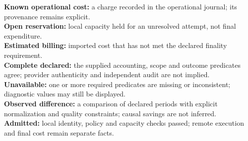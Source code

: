 \documentclass[10pt,twocolumn]{article}
\begin{document}
\noindent\textbf{Known operational cost:} a charge recorded in the operational journal; its provenance remains explicit.\\
\textbf{Open reservation:} local capacity held for an unresolved attempt, not final expenditure.\\
\textbf{Estimated billing:} imported cost that has not met the declared finality requirement.\\
\textbf{Complete declared:} the supplied accounting, scope and outcome predicates agree; provider authenticity and independent audit are not implied.\\
\textbf{Unavailable:} one or more required predicates are missing or inconsistent; diagnostic values may still be displayed.\\
\textbf{Observed difference:} a comparison of declared periods with explicit normalization and quality constraints; causal savings are not inferred.\\
\textbf{Admitted:} local identity, policy and capacity checks passed; remote execution and final cost remain separate facts.
\end{document}
